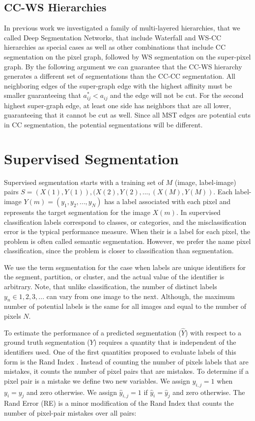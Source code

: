 \documentclass[letterpaper,twocolumn,fleqn]{article}
\begin{document}
\subsection{CC-WS Hierarchies}

In previous work we investigated a family of multi-layered hierarchies, that we called Deep Segmentation Networks, that include Waterfall and WS-CC hierarchies as special cases as well as other combinations that include CC segmentation on the pixel graph, followed by WS segmentation on the super-pixel graph. By the following argument we can guarantee that the CC-WS hierarchy generates a different set of segmentations than the CC-CC segmentation. All neighboring edges of the super-graph edge with the highest affinity must be smaller guaranteeing that $a_{ij}^*< a_{ij}$ and the edge will not be cut. For the second highest super-graph edge, at least one side has neighbors that are all lower, guaranteeing that it cannot be cut as well. Since all MST edges are potential cuts in CC segmentation, the potential segmentations will be different. 

\section{Supervised Segmentation}

Supervised segmentation starts with a training set of $M$ (image, label-image) pairs $S={(X(1),Y(1)), (X(2), Y(2),...,(X(M),Y(M))}$. Each label-image $Y(m) = (y_1, y_2, ..., y_N)$ has a label associated with each pixel and represents the target segmentation for the image $X(m)$. In supervised classification labels correspond to classes, or categories, and the misclassification error is the typical performance measure. When their is a label for each pixel, the problem is often called semantic segmentation. However, we prefer the name pixel classification, since the problem is closer to classification than segmentation. 

We use the term segmentation for the case when labels are unique identifiers for the segment, partition, or cluster, and the actual value of the identifier is arbitrary. Note, that unlike classification, the number of distinct labels $y_n\in{1, 2, 3, ...}$ can vary from one image to the next. Although, the maximum number of potential labels is the same for all images and equal to the number of pixels $N$. 

To estimate the performance of a predicted segmentation ($\widehat{Y}$) with respect to a ground truth segmentation ($Y$) requires a quantity that is independent of the identifiers used. One of the first quantities proposed to evaluate labels of this form is the Rand Index \cite{Rand}. Instead of counting the number of pixels labels that are mistakes, it counts the number of pixel pairs that are mistakes. To determine if a pixel pair is a mistake we define two new variables. We assign $y_{i,j}=1$ when $y_i = y_j$ and zero otherwise. We assign $\widehat{y}_{i,j}=1$ if $\widehat{y}_i = \widehat{y}_j$ and zero otherwise. The Rand Error (RE) is a minor modification of the Rand Index that counts the number of pixel-pair mistakes over all pairs: 
\end{document}
